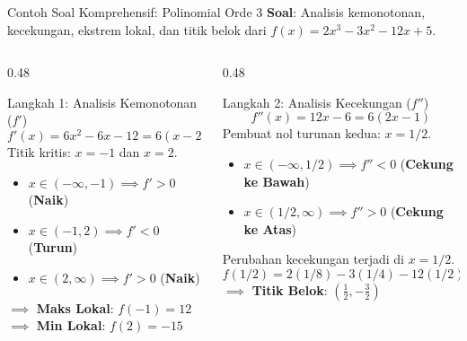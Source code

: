 \documentclass[aspectratio=169,10pt]{beamer}
\begin{document}
\begin{frame}{Contoh Soal Komprehensif: Polinomial Orde 3}
    \textbf{Soal}: Analisis kemonotonan, kecekungan, ekstrem lokal, dan titik belok dari $f(x) = 2x^3 - 3x^2 - 12x + 5$.

    \pause
    \vspace{0.1cm}
    \begin{columns}[T]
        \begin{column}{0.48\textwidth}
            \begin{block}{Langkah 1: Analisis Kemonotonan ($f'$)}
                \[
                    f'(x) = 6x^2 - 6x - 12 = 6(x - 2)(x + 1)
                \]
                Titik kritis: $x = -1$ dan $x = 2$.
                \begin{itemize}
                    \item $x \in (-\infty, -1) \implies f' > 0$ (\textbf{Naik})
                    \item $x \in (-1, 2) \implies f' < 0$ (\textbf{Turun})
                    \item $x \in (2, \infty) \implies f' > 0$ (\textbf{Naik})
                \end{itemize}
                $\implies$ \textbf{Maks Lokal}: $f(-1) = 12$\\
                $\implies$ \textbf{Min Lokal}: $f(2) = -15$
            \end{block}
        \end{column}

        \begin{column}{0.48\textwidth}
            \begin{exampleblock}{Langkah 2: Analisis Kecekungan ($f''$)}
                \[
                    f''(x) = 12x - 6 = 6(2x - 1)
                \]
                Pembuat nol turunan kedua: $x = 1/2$.
                \begin{itemize}
                    \item $x \in (-\infty, 1/2) \implies f'' < 0$ (\textbf{Cekung ke Bawah})
                    \item $x \in (1/2, \infty) \implies f'' > 0$ (\textbf{Cekung ke Atas})
                \end{itemize}
                Perubahan kecekungan terjadi di $x = 1/2$.
                \[
                    f(1/2) = 2(1/8) - 3(1/4) - 12(1/2) + 5 = -3/2
                \]
                $\implies$ \textbf{Titik Belok}: $\left(\frac{1}{2}, -\frac{3}{2}\right)$
            \end{exampleblock}
        \end{column}
    \end{columns}
\end{frame}
\end{document}
